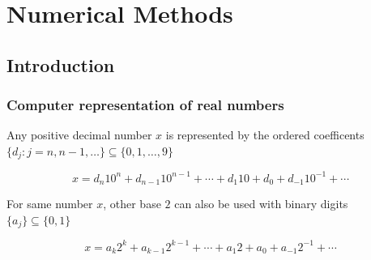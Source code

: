 \documentclass[]{book}
\newenvironment{Shaded}{\begin{snugshade}}{\end{snugshade}}
\newcommand{\CommentTok}[1]{\textcolor[rgb]{0.56,0.35,0.01}{\textit{#1}}}
\newcommand{\DataTypeTok}[1]{\textcolor[rgb]{0.13,0.29,0.53}{#1}}
\newcommand{\KeywordTok}[1]{\textcolor[rgb]{0.13,0.29,0.53}{\textbf{#1}}}
\newcommand{\NormalTok}[1]{#1}
\newcommand{\StringTok}[1]{\textcolor[rgb]{0.31,0.60,0.02}{#1}}
\theoremstyle{definition}
\theoremstyle{definition}
\theoremstyle{definition}
\theoremstyle{remark}
\begin{document}
\begin{Shaded}
\end{Shaded}

\hypertarget{numerical-methods}{%
\chapter{Numerical Methods}\label{numerical-methods}}

\hypertarget{introduction-1}{%
\section{Introduction}\label{introduction-1}}

\hypertarget{computer-representation-of-real-numbers}{%
\subsection{Computer representation of real numbers}\label{computer-representation-of-real-numbers}}

Any positive decimal number \(x\) is represented by the ordered coefficents \(\{ d_j : j = n, n - 1, \ldots \} \subseteq \{ 0, 1, \ldots, 9 \}\)

\begin{equation}
  x = d_n 10^n + d_{n - 1} 10 ^{n - 1} + \cdots + d_1 10 + d_0 + d_{-1} 10^{-1} + \cdots
  \label{eq:decimal}
\end{equation}

For same number \(x\), other base \(2\) can also be used with binary digits \(\{ a_j \} \subseteq \{ 0, 1 \}\)

\begin{equation}
  x = a_k 2^k + a_{k - 1} 2 ^{k - 1} + \cdots + a_1 2 + a_0 + a_{-1} 2^{-1} + \cdots
  \label{eq:base2}
\end{equation}
\end{document}
